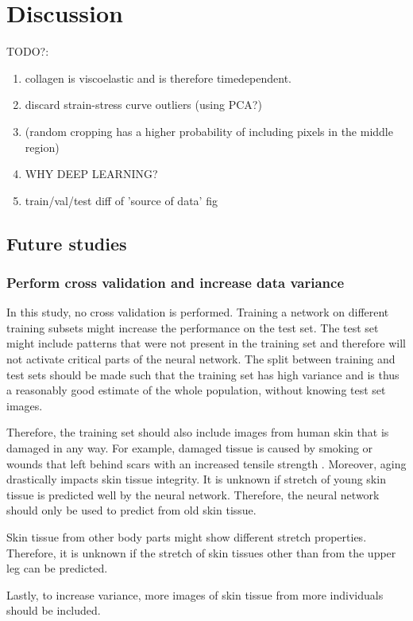 \chapter{Discussion}

TODO?:
\begin{enumerate}
    \item collagen is viscoelastic and is therefore timedependent.
    \item discard strain-stress curve outliers (using PCA?)
    \item (random cropping has a higher probability of including pixels in the middle region)
    \item WHY DEEP LEARNING?
    \item train/val/test diff of 'source of data' fig
\end{enumerate}

\section{Future studies}
\subsection{Perform cross validation and increase data variance}
In this study, no cross validation is performed.
Training a network on different training subsets might increase the performance on the test set.
The test set might include patterns that were not present in the training set and therefore will not activate critical parts of the neural network.
The split between training and test sets should be made such that the training set has high variance and is thus a reasonably good estimate of the whole population, without knowing test set images.

Therefore, the training set should also include images from human skin that is damaged in any way.
For example, damaged tissue is caused by smoking \cite{Lipa2021} or wounds that left behind scars with an increased tensile strength \cite{Wilkinson2020}.
Moreover, aging drastically impacts skin tissue integrity.
It is unknown if stretch of young skin tissue is predicted well by the neural network.
Therefore, the neural network should only be used to predict from old skin tissue.

Skin tissue from other body parts might show different stretch properties.
Therefore, it is unknown if the stretch of skin tissues other than from the upper leg can be predicted.

Lastly, to increase variance, more images of skin tissue from more individuals should be included.

